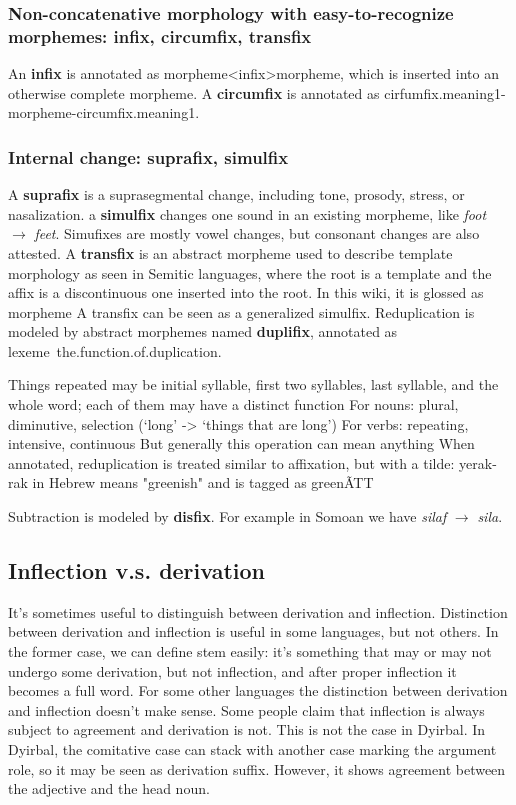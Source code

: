 \documentclass[UTF8, a4paper, oneside, scheme=plain]{ctexart}
\newcommand*{\concept}[1]{\textbf{#1}}
\newcommand*{\corpus}[1]{\emph{#1}}
\newcommand*{\translate}[1]{`#1'}
\begin{document}
\subsubsection{Non-concatenative morphology with easy-to-recognize morphemes: infix, circumfix, transfix}

An \concept{infix} is annotated as morpheme<infix>morpheme,
which is inserted into an otherwise complete morpheme.
A \concept{circumfix} is annotated as cirfumfix.meaning1-morpheme-circumfix.meaning1.


\subsubsection{Internal change: suprafix, simulfix}

A \concept{suprafix} is a suprasegmental change, including tone, prosody, stress, or nasalization.
a \concept{simulfix} changes one sound in an existing morpheme,
like \corpus{foot} $\to$ \corpus{feet}.
Simufixes are mostly vowel changes,
but consonant changes are also attested.
A \concept{transfix} is an abstract morpheme used to describe 
template morphology as seen in Semitic languages, 
where the root is a template and the affix is a discontinuous one inserted into the root. 
In this wiki, it is glossed as morpheme 
A transfix can be seen as a generalized simulfix.
Reduplication is modeled by abstract morphemes named \concept{duplifix},
annotated as lexeme~the.function.of.duplication.

Things repeated may be initial syllable, first two syllables, last syllable, and the whole word; each of them may have a distinct function
For nouns: plural, diminutive, selection (\translate{long} -> \translate{things that are long})
For verbs: repeating, intensive, continuous
But generally this operation can mean anything
When annotated, reduplication is treated similar to affixation, but with a tilde: yerak-rak in Hebrew means "greenish" and is tagged as green\~ATT

Subtraction is modeled by \concept{disfix}.
For example in Somoan we have \corpus{silaf} $\to$ \corpus{sila}.

\subsection{Inflection v.s. derivation}

It's sometimes useful to distinguish between derivation and inflection. 
Distinction between derivation and inflection is useful in some languages, but not others. 
In the former case, we can define stem easily: it's something that may or may not undergo some derivation, 
but not inflection, and after proper inflection it becomes a full word. 
For some other languages the distinction between derivation and inflection doesn't make sense. 
Some people claim that inflection is always subject to agreement and derivation is not. 
This is not the case in Dyirbal. 
In Dyirbal, the comitative case can stack with another case marking the argument role, 
so it may be seen as derivation suffix. 
However, it shows agreement between the adjective and the head noun.
\end{document}
